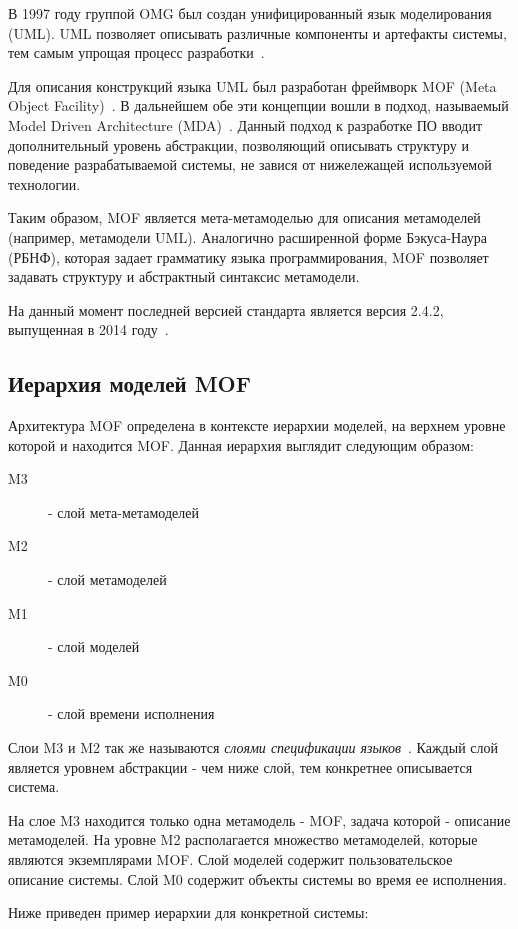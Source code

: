 В 1997 году группой OMG был создан унифицированный язык моделирования (UML).
UML позволяет описывать различные компоненты и артефакты системы, тем
самым упрощая процесс разработки~\cite{Fowler03}.

Для описания конструкций языка UML был разработан фреймворк MOF (Meta Object
Facility)~\cite{mof}. В дальнейшем обе эти концепции вошли в подход, называемый
Model Driven Architecture (MDA)~\cite{miller2003}. Данный подход к разработке ПО
вводит дополнительный уровень абстракции, позволяющий описывать структуру и
поведение разрабатываемой системы, не завися от нижележащей используемой
технологии.

Таким образом, MOF является мета-метамоделью для описания метамоделей (например,
метамодели UML). Аналогично расширенной форме Бэкуса-Наура (РБНФ), которая
задает грамматику языка программирования, MOF позволяет задавать структуру и
абстрактный синтаксис метамодели.

На данный момент последней версией стандарта является версия 2.4.2, выпущенная в
2014 году~\cite{mof}.

\subsection{Иерархия моделей MOF}

Архитектура MOF определена в контексте иерархии моделей, на верхнем уровне
которой и находится MOF. Данная иерархия выглядит следующим образом:

\begin{description}
    \item[M3] - слой мета-метамоделей
    \item[M2] - слой метамоделей
    \item[M1] - слой моделей
    \item[M0] - слой времени исполнения
\end{description}

Слои M3 и M2 так же называются \emph{слоями спецификации
языков}~\cite{essay57286}. Каждый слой является уровнем абстракции - чем ниже
слой, тем конкретнее описывается система.

На слое M3 находится только одна метамодель - MOF,
задача которой - описание метамоделей. На уровне M2 располагается множество
метамоделей, которые являются экземплярами MOF. Слой моделей
содержит пользовательское описание системы. Слой M0 содержит объекты системы во
время ее исполнения.

Ниже приведен пример иерархии для конкретной системы:

